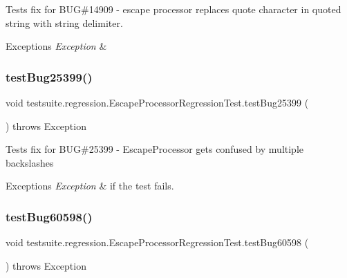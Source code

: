Tests fix for B\+UG\#14909 -\/ escape processor replaces quote character in quoted string with string delimiter.


\begin{DoxyExceptions}{Exceptions}
{\em Exception} & \\
\hline
\end{DoxyExceptions}
\mbox{\label{classtestsuite_1_1regression_1_1_escape_processor_regression_test_a807fc950104890375b5291b116c9c45a}} 
\subsubsection{\texorpdfstring{test\+Bug25399()}{testBug25399()}}
{\footnotesize\ttfamily void testsuite.\+regression.\+Escape\+Processor\+Regression\+Test.\+test\+Bug25399 (\begin{DoxyParamCaption}{ }\end{DoxyParamCaption}) throws Exception}

Tests fix for B\+UG\#25399 -\/ Escape\+Processor gets confused by multiple backslashes


\begin{DoxyExceptions}{Exceptions}
{\em Exception} & if the test fails. \\
\hline
\end{DoxyExceptions}
\mbox{\label{classtestsuite_1_1regression_1_1_escape_processor_regression_test_a39062afbb30ff8c361ed8fdfaad6f971}} 
\subsubsection{\texorpdfstring{test\+Bug60598()}{testBug60598()}}
{\footnotesize\ttfamily void testsuite.\+regression.\+Escape\+Processor\+Regression\+Test.\+test\+Bug60598 (\begin{DoxyParamCaption}{ }\end{DoxyParamCaption}) throws Exception}

